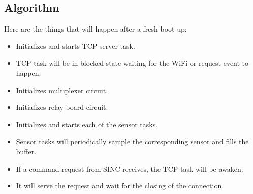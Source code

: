 \documentclass[../../main]{subfiles}
\begin{document}
\subsection{Algorithm}

Here are the things that will happen after a fresh boot up:

\begin{itemize}
    \item Initializes and starts TCP server task.
    \item TCP task will be in blocked state waiting for the WiFi or request event to happen.
    \item Initializes multiplexer circuit.
    \item Initializes relay board circuit.
    \item Initializes and starts each of the sensor tasks.
    \item Sensor tasks will periodically sample the corresponding sensor and fills the buffer.
    \item If a command request from SINC receives, the TCP task will be awaken.
    \item It will serve the request and wait for the closing of the connection.
\end{itemize}
\end{document}

